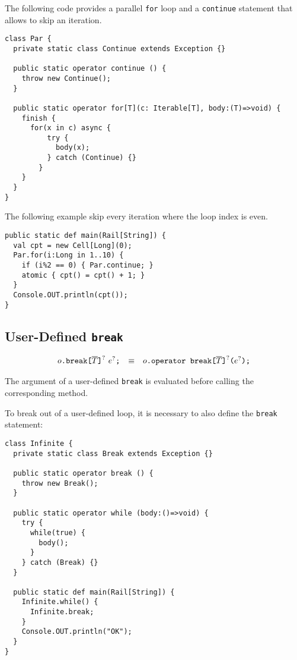 \begin{example}
  The following code provides a parallel \verb+for+ loop and a
  \verb+continue+ statement that allows to skip an iteration.
\begin{verbatim}
class Par {
  private static class Continue extends Exception {}

  public static operator continue () {
    throw new Continue();
  }

  public static operator for[T](c: Iterable[T], body:(T)=>void) {
    finish {
      for(x in c) async {
          try {
            body(x);
          } catch (Continue) {}
        }
    }
  }
}
\end{verbatim}
  The following example skip every iteration where the loop index is
  even.
\begin{verbatim}
public static def main(Rail[String]) {
  val cpt = new Cell[Long](0);
  Par.for(i:Long in 1..10) {
    if (i%2 == 0) { Par.continue; }
    atomic { cpt() = cpt() + 1; }
  }
  Console.OUT.println(cpt());
}
\end{verbatim}
\end{example}


\subsection{User-Defined \texttt{break}}

$$
\begin{array}{rcl}
  {o}\texttt{.break}\texttt{[}{\overline{T}}\texttt{]}^?~{e}^?\texttt{;}
  & \equiv &
  {o}\texttt{.operator break}\texttt{[}{\overline{T}}\texttt{]}^?\texttt{(}{e}^?\texttt{);}
\end{array}
$$

The argument of a user-defined \verb+break+ is
evaluated before calling the corresponding method.

\begin{example}
  To break out of a user-defined loop, it is necessary to also define
  the \verb+break+ statement:
\begin{verbatim}
class Infinite {
  private static class Break extends Exception {}

  public static operator break () {
    throw new Break();
  }

  public static operator while (body:()=>void) {
    try {
      while(true) {
        body();
      }
    } catch (Break) {}
  }

  public static def main(Rail[String]) {
    Infinite.while() {
      Infinite.break;
    }
    Console.OUT.println("OK");
  }
}
\end{verbatim}
\end{example}



